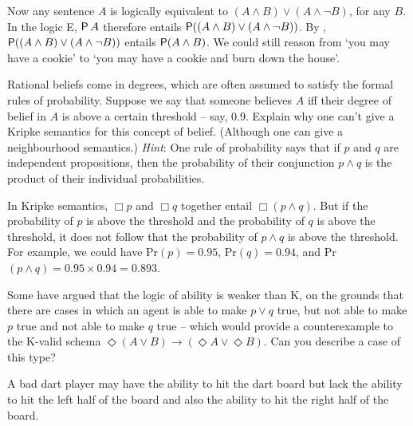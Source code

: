 Now any sentence $A$ is logically equivalent to
$(A \land B) \lor (A \land \neg B)$, for any $B$. In the logic E, $\operatorname{\mathsf{P}} A$
therefore entails $\operatorname{\mathsf{P}} ((A \land B) \lor (A \land \neg B))$. By ,
$\operatorname{\mathsf{P}} ((A \land B) \lor (A \land \neg B))$ entails $\operatorname{\mathsf{P}} (A \land B)$. We could
still reason from `you may have a cookie' to `you may have a cookie and burn
down the house'.

\begin{exercise}
  Rational beliefs come in degrees, which are often assumed to satisfy the
  formal rules of probability. Suppose we say that someone believes $A$ iff
  their degree of belief in $A$ is above a certain threshold -- say, 0.9.
  Explain why one can't give a Kripke semantics for this concept of belief.
  (Although one can give a neighbourhood semantics.) \emph{Hint}: One rule of
  probability says that if $p$ and $q$ are independent propositions, then the
  probability of their conjunction $p \land q$ is the product of their
  individual probabilities.
\end{exercise}
\begin{solution}
  In Kripke semantics, $\Box p$ and $\Box q$ together entail $\Box(p \land
  q)$. But if the probability of $p$ is above the threshold and the probability
  of $q$ is above the threshold, it does not follow that the probability of
  $p\land q$ is above the threshold. For example, we could have Pr$(p)=0.95$,
  Pr$(q)=0.94$, and Pr$(p \land q) = 0.95 \times 0.94 = 0.893$.
\end{solution}

\begin{exercise}
  Some have argued that the logic of ability is weaker than K, on the grounds
  that there are cases in which an agent is able to make $p \lor q$ true, but
  not able to make $p$ true and not able to make $q$ true -- which would provide a counterexample to the K-valid schema $\Diamond(A \lor B) \to (\Diamond A \lor \Diamond B)$. Can you describe a case of this type?
\end{exercise}
\begin{solution}
  A bad dart player may have the ability to hit the dart board but lack the
  ability to hit the left half of the board and also the ability to hit the
  right half of the board.  
\end{solution}



